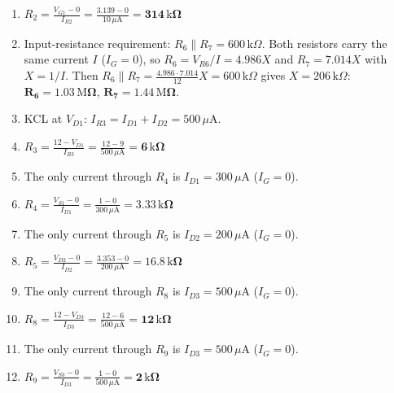 \documentclass[11pt]{article}
\begin{document}
\begin{enumerate}[leftmargin=*,itemsep=3pt]
\item $\displaystyle R_{2} = \frac{V_{G1} - 0}{I_{R2}} = \frac{3.139 - 0}{10\,\mu \mathrm{A}} = \mathbf{314\,\mathrm{k}\Omega}$
\item Input-resistance requirement: $R_{6}\|R_{7} = 600\,\mathrm{k}\Omega$. Both resistors carry the same current $I$ ($I_G = 0$), so $R_{6} = V_{R6}/I = 4.986X$ and $R_{7} = 7.014X$ with $X = 1/I$. Then $R_{6}\|R_{7} = \frac{4.986\cdot7.014}{12}X = 600\,\mathrm{k}\Omega$ gives $X = 206\,\mathrm{k}\Omega$: $\mathbf{R_{6} = 1.03\,\mathrm{M}\Omega}$, $\mathbf{R_{7} = 1.44\,\mathrm{M}\Omega}$.
\item KCL at $V_{D1}$: $I_{R3} = I_{D1} + I_{D2} = 500\,\mu \mathrm{A}$.
\item $\displaystyle R_{3} = \frac{12 - V_{D1}}{I_{R3}} = \frac{12 - 9}{500\,\mu \mathrm{A}} = \mathbf{6\,\mathrm{k}\Omega}$
\item The only current through $R_{4}$ is $I_{D1} = 300\,\mu \mathrm{A}$ ($I_G = 0$).
\item $\displaystyle R_{4} = \frac{V_{S1} - 0}{I_{D1}} = \frac{1 - 0}{300\,\mu \mathrm{A}} = \mathbf{3.33\,\mathrm{k}\Omega}$
\item The only current through $R_{5}$ is $I_{D2} = 200\,\mu \mathrm{A}$ ($I_G = 0$).
\item $\displaystyle R_{5} = \frac{V_{D2} - 0}{I_{D2}} = \frac{3.353 - 0}{200\,\mu \mathrm{A}} = \mathbf{16.8\,\mathrm{k}\Omega}$
\item The only current through $R_{8}$ is $I_{D3} = 500\,\mu \mathrm{A}$ ($I_G = 0$).
\item $\displaystyle R_{8} = \frac{12 - V_{D3}}{I_{D3}} = \frac{12 - 6}{500\,\mu \mathrm{A}} = \mathbf{12\,\mathrm{k}\Omega}$
\item The only current through $R_{9}$ is $I_{D3} = 500\,\mu \mathrm{A}$ ($I_G = 0$).
\item $\displaystyle R_{9} = \frac{V_{S3} - 0}{I_{D3}} = \frac{1 - 0}{500\,\mu \mathrm{A}} = \mathbf{2\,\mathrm{k}\Omega}$
\end{enumerate}
\end{document}
